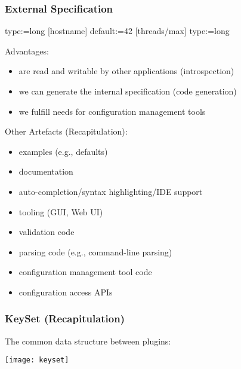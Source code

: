 \begin{frame}[fragile]
	\frametitle{External Specification}

	\begin{code}[gobble=4]
	[port]
	type:=long
	[hostname]
	default:=42
	[threads/max]
	type:=long
	\end{code}

	\vspace{1em}

	Advantages:
	\pause
	\begin{itemize}
	\item are read and writable by other applications (introspection)
	\item we can generate the internal specification (code generation)
	\item we fulfill needs for configuration management tools
	\end{itemize}
\end{frame}

\begin{frame}
	Other Artefacts (Recapitulation):

	\pause

	\begin{itemize}
	\item examples (e.g., defaults)
	\item documentation
	\item auto-completion/syntax highlighting/IDE support
	\item tooling (GUI, Web UI)
	\item validation code
	\item parsing code (e.g., command-line parsing)
	\item configuration management tool code
	\item configuration access APIs
	\end{itemize}
\end{frame}

\begin{frame}
	\frametitle{KeySet (Recapitulation)}

	The common data structure between plugins:
	\vspace{1cm}

	\texttt{[image: keyset]}
\end{frame}

